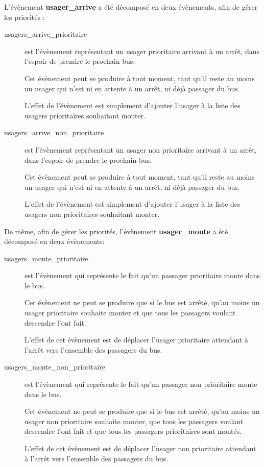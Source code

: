 \documentclass[a4paper,titlepage]{report}
\begin{document}
		L'évènement \textbf{usager\_arrive} a été décomposé en deux évènements, afin de gérer les priorités :
		\begin{description}
			\item[usagers\_arrive\_prioritaire] est l'évènement représentant un usager prioritaire arrivant à un arrêt, dans l'espoir de prendre le prochain bus.
			
			Cet évènement peut se produire à tout moment, tant qu'il reste au moins un usager qui n'est ni en attente à un arrêt, ni déjà passager du bus.
			
			L'effet de l'évènement est simplement d'ajouter l'usager à la liste des usagers prioritaires souhaitant monter.
			
			\item[usagers\_arrive\_non\_prioritaire] est l'évènement représentant un usager non prioritaire arrivant à un arrêt, dans l'espoir de prendre le prochain bus.
			
			Cet évènement peut se produire à tout moment, tant qu'il reste au moins un usager qui n'est ni en attente à un arrêt, ni déjà passager du bus.
			
			L'effet de l'évènement est simplement d'ajouter l'usager à la liste des usagers non prioritaires souhaitant monter.\\
		\end{description}
		

		De même, afin de gérer les priorités, l'évènement \textbf{usager\_monte} a été décomposé en deux évènements:
		
		\begin{description}
			\item[usagers\_monte\_prioritaire] est l'évènement qui représente le fait qu'un passager prioritaire monte dans le bus.
			
			Cet évènement ne peut se produire que si le bus est arrêté, qu'au moins un usager prioritaire souhaite monter et que tous les passagers voulant descendre l'ont fait.
			
			L'effet de cet évènement est de déplacer l'usager prioritaire attendant à l'arrêt vers l'ensemble des passagers du bus.\\
			
			\item[usagers\_monte\_non\_prioritaire] est l'évènement qui représente le fait qu'un passager non prioritaire monte dans le bus.
			
			Cet évènement ne peut se produire que si le bus est arrêté, qu'au moins un usager non prioritaire souhaite monter, que tous les passagers voulant descendre l'ont fait et que tous les passagers prioritaires sont montés.
			
			L'effet de cet évènement est de déplacer l'usager non prioritaire attendant à l'arrêt vers l'ensemble des passagers du bus.\\
		\end{description}
		
\end{document}
